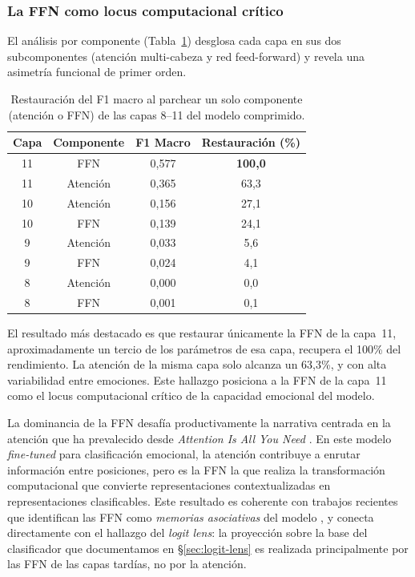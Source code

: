 \subsubsection{La FFN como locus computacional crítico}

El análisis por componente (Tabla~\ref{tab:patching-componentes})
desglosa cada capa en sus dos subcomponentes (atención multi-cabeza y
red feed-forward) y revela una asimetría funcional de primer
orden.

\begin{table}[ht]
\centering
\caption{Restauración del F1 macro al parchear un solo componente
(atención o FFN) de las capas 8--11 del modelo comprimido.}
\label{tab:patching-componentes}
\begin{tabular}{cccc}
\toprule
\textbf{Capa} & \textbf{Componente} & \textbf{F1 Macro} & \textbf{Restauración (\%)} \\
\midrule
11 & FFN       & 0{,}577 & \textbf{100{,}0} \\
11 & Atención  & 0{,}365 & 63{,}3 \\
10 & Atención  & 0{,}156 & 27{,}1 \\
10 & FFN       & 0{,}139 & 24{,}1 \\
9  & Atención  & 0{,}033 & 5{,}6 \\
9  & FFN       & 0{,}024 & 4{,}1 \\
8  & Atención  & 0{,}000 & 0{,}0 \\
8  & FFN       & 0{,}001 & 0{,}1 \\
\bottomrule
\end{tabular}
\end{table}

El resultado más destacado es que restaurar únicamente la FFN
de la capa~11, aproximadamente un tercio de los parámetros de esa
capa, recupera el 100\% del rendimiento. La atención de la misma
capa solo alcanza un 63{,}3\%, y con alta variabilidad entre emociones.
Este hallazgo posiciona a la FFN de la capa~11 como el locus
computacional crítico de la capacidad emocional del modelo.

La dominancia de la FFN desafía productivamente la narrativa centrada
en la atención que ha prevalecido desde \emph{Attention Is All You
Need} \cite{vaswani2017attention}. En este modelo \emph{fine-tuned} para
clasificación emocional, la atención contribuye a enrutar información
entre posiciones, pero es la FFN la que realiza la transformación
computacional que convierte representaciones contextualizadas en
representaciones clasificables. Este resultado es coherente con
trabajos recientes que identifican las FFN como \textit{memorias
asociativas} del modelo \cite{geva2021transformer}, y conecta
directamente con el hallazgo del \emph{logit lens}: la proyección sobre la
base del clasificador que documentamos en \S\ref{sec:logit-lens} es
realizada principalmente por las FFN de las capas tardías, no por la
atención.

